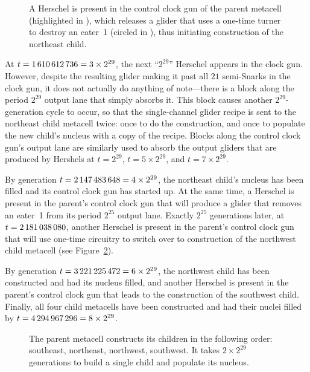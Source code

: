 \begin{figure}[!htb]
	\centering
	\caption{A Herschel is present in the control clock gun of the parent metacell (highlighted in ), which releases a glider that uses a one-time turner to destroy an eater~1 (circled in ), thus initiating construction of the northeast child.}
	\label{fig:0e0p_timeline_1073741824}
\end{figure}

At $t = 1{\,}610{\,}612{\,}736 = 3 \times 2^{29}$, the next ``$2^{29}$'' Herschel appears in the clock gun. However, despite the resulting glider making it past all $21$ semi-Snarks in the clock gun, it does not actually do anything of note---there is a block along the period $2^{29}$ output lane that simply absorbs it. This block causes another $2^{29}$-generation cycle to occur, so that the single-channel glider recipe is sent to the northeast child metacell twice: once to do the construction, and once to populate the new child's nucleus with a copy of the recipe. Blocks along the control clock gun's output lane are similarly used to absorb the output gliders that are produced by Hershels at $t = 2^{29}$, $t = 5 \times 2^{29}$, and $t = 7 \times 2^{29}$.

By generation $t = 2{\,}147{\,}483{\,}648 = 4 \times 2^{29}$, the northeast child's nucleus has been filled and its control clock gun has started up. At the same time, a Herschel is present in the parent's control clock gun that will produce a glider that removes an eater~1 from its period $2^{25}$ output lane. Exactly $2^{25}$ generations later, at $t = 2{\,}181{\,}038{\,}080$, another Herschel is present in the parent's control clock gun that will use one-time circuitry to switch over to construction of the northwest child metacell (see Figure~\ref{fig:0e0p_timeline_2147483648}).

By generation $t = 3{\,}221{\,}225{\,}472 = 6 \times 2^{29}$, the northwest child has been constructed and had its nucleus filled, and another Herschel is present in the parent's control clock gun  that leads to the construction of the southwest child. Finally, all four child metacells have been constructed and had their nuclei filled by $t = 4{\,}294{\,}967{\,}296 = 8 \times 2^{29}$.

\begin{figure}[!htb]
	\centering
	\caption{The parent metacell constructs its children in the following order: southeast, northeast, northwest, southwest. It takes $2 \times 2^{29}$ generations to build a single child and populate its nucleus.}
	\label{fig:0e0p_timeline_2147483648}
\end{figure}


